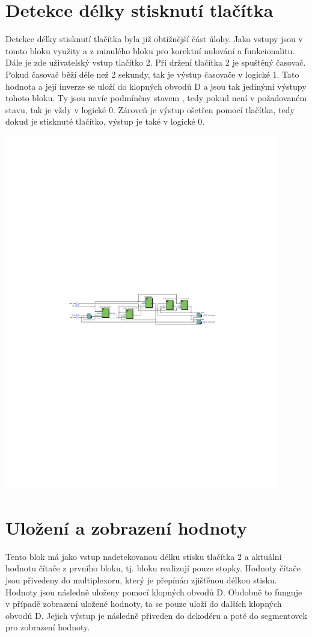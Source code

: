 \documentclass[FM,ZP]{tulthesis}
\begin{document}
	\section{Detekce délky stisknutí tlačítka}
	Detekce délky stisknutí tlačítka byla již obtížnější část úlohy. Jako vstupy jsou v tomto bloku využity  a  z minulého bloku pro korektní nulování a funkcionalitu. Dále je zde uživatelský vstup tlačítko 2.
	Při držení tlačítka 2 je spuštěný časovač. Pokud časovač běží déle než 2 sekundy, tak je výstup časovače v logické 1. Tato hodnota a její inverze se uloží do klopných obvodů D a jsou tak jedinými výstupy tohoto bloku. Ty jsou navíc podmíněny stavem , tedy pokud není v požadovaném stavu, tak je vždy v logické 0. Zároveň je výstup ošetřen pomocí tlačítka, tedy dokud je stisknuté tlačítko, výstup je také v logické 0.
	
	\includegraphics[clip,width=0.9\textwidth]{hold_detector.pdf}
	
	\section{Uložení a zobrazení hodnoty}
	Tento blok má jako vstup nadetekovanou délku stisku tlačítka 2 a aktuální hodnotu čítače z prvního bloku, tj. bloku realizují pouze stopky. Hodnoty čítače jsou přivedeny do multiplexoru, který je přepínán zjištěnou délkou stisku. Hodnoty jsou následně uloženy pomocí klopných obvodů D. Obdobně to funguje v případě zobrazení uložené hodnoty, ta se pouze uloží do dalších klopných obvodů D. Jejich výstup je následně přiveden do dekodéru a poté do segmentovek pro zobrazení hodnoty.
	
\end{document}
